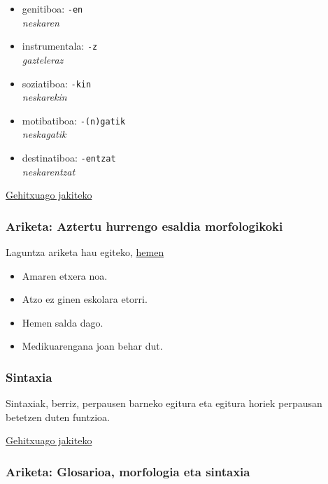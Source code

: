 \documentclass[
]{book}
\providecommand{\tightlist}{%
  \setlength{\itemsep}{0pt}\setlength{\parskip}{0pt}}
\begin{document}
\begin{itemize}
\tightlist
\item
  genitiboa: \texttt{-en}\\
  \emph{neskaren}
\item
  instrumentala: \texttt{-z}\\
  \emph{gazteleraz}
\item
  soziatiboa: \texttt{-kin}\\
  \emph{neskarekin}
\item
  motibatiboa: \texttt{-(n)gatik}\\
  \emph{neskagatik}
\item
  destinatiboa: \texttt{-entzat}\\
  \emph{neskarentzat}
\end{itemize}

\href{https://www.hiru.eus/eu/lengua-vasca/sintagmas-de-la-oracion-declinacion}{Gehitxuago jakiteko}

\hypertarget{ariketa-aztertu-hurrengo-esaldia-morfologikoki}{%
\subsubsection*{Ariketa: Aztertu hurrengo esaldia morfologikoki}\label{ariketa-aztertu-hurrengo-esaldia-morfologikoki}}

Laguntza ariketa hau egiteko, \href{http://ixa2.si.ehu.es/demo/analisianali.jsp}{hemen}

\begin{itemize}
\tightlist
\item
  Amaren etxera noa.
\item
  Atzo ez ginen eskolara etorri.
\item
  Hemen salda dago.
\item
  Medikuarengana joan behar dut.
\end{itemize}

\hypertarget{sintaxia}{%
\subsubsection{Sintaxia}\label{sintaxia}}

Sintaxiak, berriz, perpausen barneko egitura eta egitura horiek
perpausan betetzen duten funtzioa.

\href{https://www.ehu.eus/seg/hizk/1/4}{Gehitxuago jakiteko}

\hypertarget{T2A2}{%
\subsubsection*{Ariketa: Glosarioa, morfologia eta sintaxia}\label{T2A2}}
\end{document}
